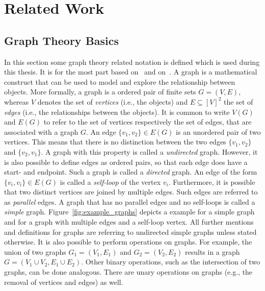 \chapter{Related Work}


\section{Graph Theory Basics}

In this section some graph theory related notation is defined which is used during this thesis.
It is for the most part based on~\cite{Thulasiraman1992} and on~\cite{Diestel2012}.
A graph is a mathematical construct that can be used to model and explore the relationship between objects.
More formally, a graph is a ordered pair of finite sets \(G = (V, E)\), whereas \(V\) denotes the set of \emph{vertices} (i.e., the objects) and \(E \subseteq [V]^{2} \) the set of \emph{edges} (i.e., the relationships between the objects).
It is common to write \(V(G)\) and \(E(G)\) to refer to the set of vertices  respectively the set of edges, that are associated with a graph \(G\).
An edge \(\{v_1, v_2\} \in E(G)\) is an unordered pair of two vertices.
This means that there is no distinction between the two edges \(\{v_1, v_2 \}\) and \(\{v_2, v_1\}\).
A graph with this property is called a \emph{undirected} graph.
However, it is also possible to define edges as ordered pairs, so that each edge does have a start- and endpoint.
Such a graph is called a \emph{directed} graph.
An edge of the form \(\{v_i, v_i\} \in E(G)\) is called a \emph{self-loop} of the vertex \(v_i\).
Furthermore, it is possible that two distinct vertices are joined by multiple edges.
Such edges are referred to as \emph{parallel} edges.
A graph that has no parallel edges and no self-loops is called a \emph{simple} graph.
Figure~\ref{fig:example_graphs} depicts a example for a simple graph and for a graph with multiple edges and a self-loop vertex.
All further mentions and definitions for graphs are referring to undirected simple graphs unless stated otherwise.
It is also possible to perform operations on graphs.
For example, the union of two graphs \(G_{1} = (V_{1}, E_{1})\) and \(G_{2} = (V_{2}, E_{2})\) results in a graph \(G = (V_{1} \cup V_{2}, E_{1} \cup E_{2})\).
Other binary operations, such as the intersection of two graphs, can be done analogous.
There are unary operations on graphs (e.g., the removal of vertices and edges) as well.

